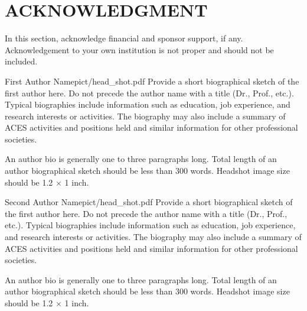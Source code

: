 \documentclass[letterpaper,twocolumn]{ACESJournal}
\newcommand{\red}[1]{{\color{red}#1}}
\begin{document}
\section*{ACKNOWLEDGMENT}
%
In this section, acknowledge financial and sponsor support, if any. \red{Acknowledgement to your own institution is not proper and should not be included.}
%


%
\begin{ACESbiography}{First Author Name}{pict/head_shot.pdf}
Provide a short biographical sketch of the first author here. \red{Do not precede the author name with a title (Dr., Prof., etc.).} Typical biographies include information such as education, job experience, and research interests or activities. The biography may also include a summary of ACES activities and positions held and similar information for other professional societies.

An author bio is generally one to three paragraphs long. \red{Total length of an author biographical sketch should be less than 300 words.} Headshot image size should be 1.2 $\times$ 1 inch.
\end{ACESbiography}
%
\begin{ACESbiography}{Second Author Name}{pict/head_shot.pdf}
Provide a short biographical sketch of the first author here. \red{Do not precede the author name with a title (Dr., Prof., etc.).} Typical biographies include information such as education, job experience, and research interests or activities. The biography may also include a summary of ACES activities and positions held and similar information for other professional societies.

An author bio is generally one to three paragraphs long. \red{Total length of an author biographical sketch should be less than 300 words.} Headshot image size should be 1.2 $\times$ 1 inch.
\end{ACESbiography}
%
%
\end{document}
